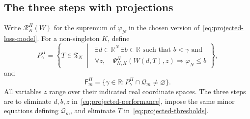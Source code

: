 \documentclass[11pt]{article}
\numberwithin{equation}{section}
\theoremstyle{definition}
\newcommand{\R}{\mathbb R}
\newcommand{\Q}{\mathcal Q}
\newcommand{\risk}{\mathcal R}
\begin{document}
\subsection{The three steps with projections}
Write $\risk_K^\Pi(W)$ for the supremum of $\varphi_N$ in the chosen version of~\eqref{eq:projected-loss-model}. For a non-singleton $K$, define
\begin{equation}
 P_\gamma^\Pi=\left\{T\in\mathfrak T_N\;\middle|\;
 \begin{array}{l}
 \exists d\in\R^N\ \exists b\in\R\text{ such that }b<\gamma\text{ and}\\[2pt]
 \forall z,\quad
 \Psi_{N,K}^\Pi(W(d,T),z)\Rightarrow\varphi_N\le b
 \end{array}
 \right\},
 \label{eq:projected-performance}
\end{equation}
and
\begin{equation}
 \mathsf F_m^\Pi
 =\{\gamma\in\R:P_\gamma^\Pi\cap\Q_m\ne\varnothing\}.
 \label{eq:projected-thresholds}
\end{equation}
All variables $z$ range over their indicated real coordinate spaces. The three steps are to eliminate $d,b,z$ in~\eqref{eq:projected-performance}, impose the same minor equations defining $\Q_m$, and eliminate $T$ in~\eqref{eq:projected-thresholds}.
\end{document}
